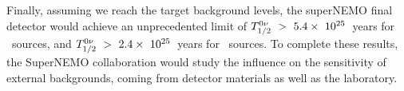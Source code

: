 Finally, assuming we reach the target background levels, the superNEMO final detector would achieve an unprecedented limit of $T_{1/2}^{0\nu}~>~5.4\times~10^{25}$~years for \Se\ sources, and $T_{1/2}^{0\nu}~>~2.4\times~10^{25}$~years for \Nd\ sources.
To complete these results, the SuperNEMO collaboration would study the influence on the sensitivity of external backgrounds, coming from detector materials as well as the laboratory.





